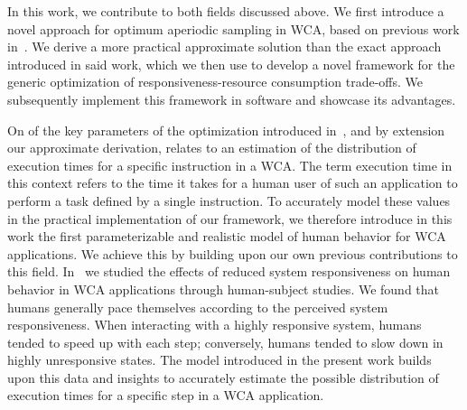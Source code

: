 \medskip

In this work, we contribute to both fields discussed above.
We first introduce a novel approach for optimum aperiodic sampling in \gls{WCA}, based on previous work in~\cite{moothedath2022energy2}.
We derive a more practical approximate solution than the exact approach introduced in said work, which we then use to develop a novel framework for the generic optimization of responsiveness-resource consumption trade-offs.
We subsequently implement this framework in software and showcase its advantages.

On of the key parameters of the optimization introduced in~\cite{moothedath2022energy2}, and by extension our approximate derivation, relates to an estimation of the distribution of execution times for a specific instruction in a \gls{WCA}.
The term execution time in this context refers to the time it takes for a human user of such an application to perform a task defined by a single instruction.
To accurately model these values in the practical implementation of our framework, we therefore introduce in this work the first parameterizable and realistic model of human behavior for \gls{WCA} applications.
We achieve this by building upon our own previous contributions to this field.
In~\cite{olguinmunoz2021impact} we studied the effects of reduced system responsiveness on human behavior in \gls{WCA} applications through human-subject studies.
We found that humans generally pace themselves according to the perceived system responsiveness.
When interacting with a highly responsive system, humans tended to speed up with each step; conversely, humans tended to slow down in highly unresponsive states.
The model introduced in the present work builds upon this data and insights to accurately estimate the possible distribution of execution times for a specific step in a \gls{WCA} application.

